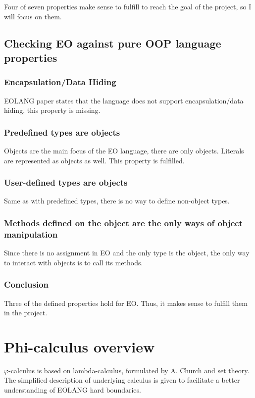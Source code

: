 Four of seven properties make sense to fulfill to reach the goal of the project, so I will focus on them.


\subsection{Checking EO against pure OOP language properties}

\subsubsection{Encapsulation/Data Hiding}

EOLANG paper \cite{eolang_phi_calculus} states that the language does not support encapsulation/data hiding, this property is missing.

\subsubsection{Predefined types are objects}
Objects are the main focus of the EO language, there are only objects. Literals are represented as objects as well. This property is fulfilled.

\subsubsection{User-defined types are objects}
Same as with predefined types, there is no way to define non-object types.

\subsubsection{Methods defined on the object are the only ways of object manipulation}
Since there is no assignment in EO and the only type is the object, the only way to interact with objects is to call its methods.

\subsubsection{Conclusion}
Three of the defined properties hold for EO. Thus, it makes sense to fulfill them in the project.


\section{Phi-calculus overview}
\label{section:phi_calculus}

$\varphi$-calculus \cite{eolang_phi_calculus} is based on lambda-calculus, formulated by A. Church \cite{church2001logic} and set theory. The simplified description of underlying calculus is given to facilitate a better understanding of EOLANG hard boundaries.

